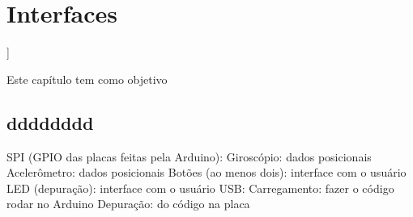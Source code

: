 \chapter{Interfaces}]

\label{CAP6}


Este capítulo tem como objetivo 


\section{dddddddd}\label{Sub:equa}
SPI (GPIO das placas feitas pela Arduino):
Giroscópio: dados posicionais
Acelerômetro: dados posicionais
Botões (ao menos dois): interface com o usuário
LED (depuração): interface com o usuário
USB:
Carregamento: fazer o código rodar no Arduino 
Depuração: do código na placa
